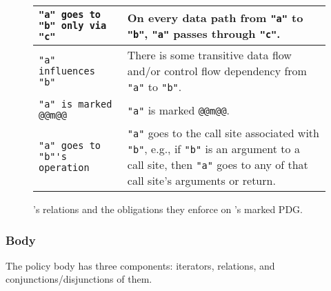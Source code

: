 \begin{figure}[t]
\begin{tabular}{|p{5.5cm}|p{8cm}|}
        \hline
        \lstinline[language=CNL]|"a" goes to "b" only via "c"|                    &  On every data path from \lstinline[language=CNL]|"a"| to \lstinline[language=CNL]|"b"|,
                                                                                    \lstinline[language=CNL]|"a"| passes through \lstinline[language=CNL]|"c"|. \\
        \hline
        \lstinline[language=CNL]|"a" influences "b"|                              &  There is some transitive data flow and/or control flow dependency from  \lstinline[language=CNL]|"a"| to \lstinline[language=CNL]|"b"|.  \\
        \hline
        \lstinline[language=CNL]|"a" is marked @@m@@|                             & \lstinline[language=CNL]|"a"| is marked \lstinline[language=CNL]|@@m@@|. \\
        \hline
        \lstinline[language=CNL]|"a" goes to "b"'s operation|                     & \lstinline[language=CNL]|"a"| goes to the call site associated with \lstinline[language=CNL]|"b"|,
                                                                                    e.g., if \lstinline[language=CNL]|"b"| is an argument to a call site, then \lstinline[language=CNL]|"a"| goes to any of that call site's arguments or return. \\        
      \hline
    \end{tabular}
      \caption{\syslang's relations and the obligations they enforce on \sys's marked PDG.}
      \label{f:relations}
  \end{figure}

\subsubsection{Body}
\label{sec:body}

The policy body has three components: iterators, relations, and conjunctions/disjunctions of them.
%
